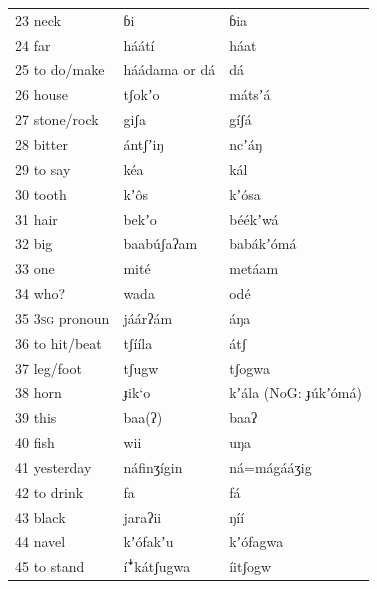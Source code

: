 \documentclass[output=paper]{langsci/langscibook}
\begin{document}
\begin{longtable}{p{}  p{} p{}}
23 neck & ɓi & ɓia \\

24 far & háátí & háat \\

25 to do/make & háádama  or     dá & dá \\

26 house & tʃokʼo & mátsʼá \\

27 stone/rock & giʃa & gíʃá \\

28 bitter & ántʃʼiŋ & ncʼáŋ \\

29 to say & kéa & kál \\

30 tooth & kʼ\^{o}s & kʼ\'{o}sa \\

31 hair & bekʼo & béékʼwá \\

32 big & baab\'{u}ʃaʔam & babákʼ\'{o}má \\

33 one & mité & metáam \\

34 who? & wada & odé \\

35 3\textsc{sg} pronoun & jáárʔám & áŋa \\

36 to hit/beat & tʃííla & átʃ \\

37 leg/foot & tʃugw & tʃogwa \\

38 horn & ɟik‘o & kʼála (NoG: ɟ\'{u}kʼ\'{o}má) \\

39 this & baa(ʔ) & baaʔ \\

40 fish & wii & uŋa \\

41 yesterday & náfinʒígin & ná=mágááʒig \\

42 to drink & fa & fá \\

43 black & jaraʔii & ŋíí \\

44 navel & kʼ\'{o}fakʼu & kʼ\'{o}fagwa \\

45 to stand & í\textsf{ꜜ}kátʃugwa & íitʃogw \\


\end{longtable}
\end{document}
